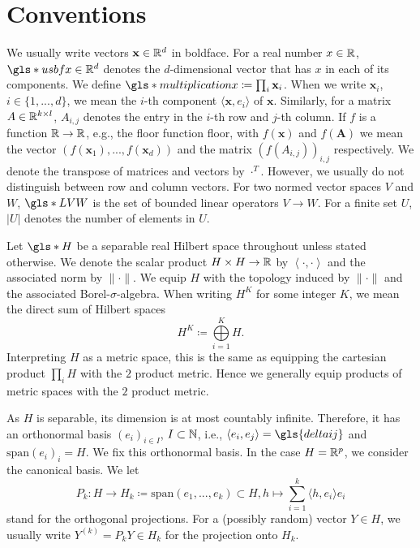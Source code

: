 \section{Conventions}

We usually write vectors $\mathbf{x} \in \mathbb{R}^d$ in boldface. For a real number $x \in \mathbb{R}$, $\gls*{usbfx} \in \RR^d$ denotes the $d$-dimensional vector that has $x$ in each of its components. We define $\gls*{multiplicationx} \coloneqq \prod_i \mathbf{x}_i$. When we write $\mathbf{x}_i$, $i \in \{1, ..., d\}$, we mean the $i$-th component $\langle \mathbf{x}, e_i \rangle$ of $\mathbf{x}$. Similarly, for a matrix $A \in \mathbb{R}^{k \times l}$, $A_{i, j}$ denotes the entry in the $i$-th row and $j$-th column.
If $f$ is a function $\mathbb{R} \to \mathbb{R}$, e.g., the floor function \gls*{floor}, with $f(\mathbf{x})$ and $f(\mathbf{A})$ we mean the vector $(f(\mathbf{x}_1), ..., f(\mathbf{x}_d))$ and the matrix $(f(A_{i, j}))_{i, j}$ respectively. We denote the transpose of matrices and vectors by $\cdot^T$. However, we usually do not distinguish between row and column vectors.
For two normed vector spaces $V$ and $W$, $\gls*{LVW}$ is the set of bounded linear operators $V \to W$.
For a finite set $U$, $|U|$ denotes the number of elements in $U$.

Let $\gls*{H}$ be a separable real Hilbert space throughout unless stated otherwise.
We denote the scalar product $H \times H \to \mathbb{R}$ by $\left\langle \cdot, \cdot \right\rangle$ and the associated norm by $\| \cdot \|$. We equip $H$ with the topology induced by $\| \cdot \|$ and the associated Borel-$\sigma$-algebra.
When writing $H^K$ for some integer $K$, we mean the direct sum of Hilbert spaces
\[ H^K \coloneqq \bigoplus\limits_{i=1}^K H. \]
Interpreting $H$ as a metric space, this is the same as equipping the cartesian product $\prod_{i} H$ with the $2$ product metric. Hence we generally equip products of metric spaces with the $2$ product metric.

As $H$ is separable, its dimension is at most countably infinite. Therefore, it has an orthonormal basis $(e_i)_{i \in I}$, $I \subset \mathbb{N}$, i.e., $\langle e_i, e_j \rangle = \gls{deltaij}$ and $\text{span}(e_i)_{i} = H$. We fix this orthonormal basis. In the case $H = \mathbb{R}^p$, we consider the canonical basis. We let
\[ P_k: H \to H_k \coloneqq \mathrm{span}(e_1, ..., e_k) \subset H, h \mapsto \sum\limits_{i=1}^k \langle h, e_i \rangle e_i \]
stand for the orthogonal projections.
For a (possibly random) vector $Y \in H$, we usually write $Y^{(k)} = P_k Y \in H_k$ for the projection onto $H_k$.

